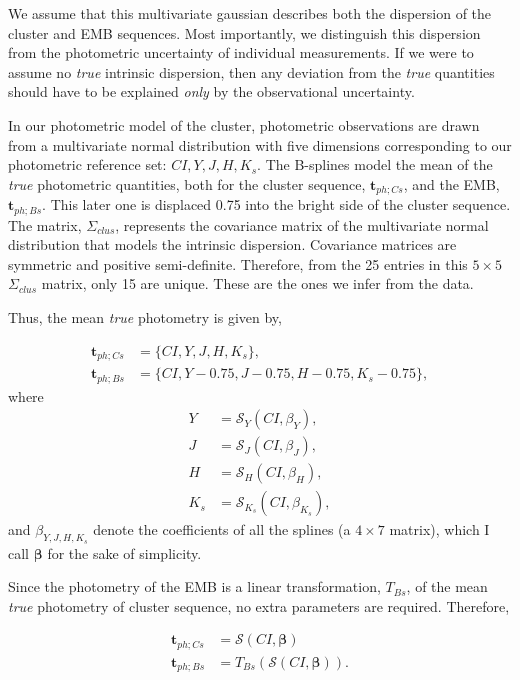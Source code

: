 We assume that this multivariate gaussian describes both the dispersion of the cluster and EMB sequences. Most importantly, we distinguish this dispersion from the photometric uncertainty of individual measurements. If we were to assume no \emph{true} intrinsic dispersion, then any deviation from the \emph{true} quantities should have to be explained \emph{only} by the observational uncertainty. 

In our photometric model of the cluster, photometric observations are drawn from a multivariate normal distribution with five dimensions corresponding to our photometric reference set: $CI,Y,J,H,K_s$. The B-splines model the mean of the \emph{true} photometric quantities, both for the cluster sequence, $\boldsymbol{t}_{ph;Cs}$, and the EMB, $\boldsymbol{t}_{ph;Bs}$. This later one is displaced 0.75 into the bright side of the cluster sequence. The matrix, $\Sigma_{clus}$, represents the covariance matrix of the multivariate normal distribution that models the intrinsic dispersion. Covariance matrices are symmetric and positive semi-definite. Therefore, from the 25 entries in this $5\times 5$ $\Sigma_{clus}$ matrix, only 15 are unique. These are the ones we infer from the data.

Thus, the mean \emph{true} photometry is given by,

\begin{align}
\boldsymbol{t}_{ph;Cs}&= \{CI,Y,J,H,K_s\},\nonumber \\
\boldsymbol{t}_{ph;Bs}&=\{CI,Y-0.75,J-0.75,H-0.75,K_s-0.75\}, \nonumber
\end{align}
where
\begin{align}
Y &=\mathcal{S}_Y(CI,\beta_Y), \nonumber \\
J &=\mathcal{S}_J(CI,\beta_J),\nonumber \\
 H &=\mathcal{S}_H(CI,\beta_H), \nonumber \\
 K_s &=\mathcal{S}_{K_s}(CI,\beta_{K_s}),  \nonumber 
\end{align}
and $\beta_{Y,J,H,K_s}$ denote the coefficients of all the splines (a $4\times7$ matrix), which  I call $\boldsymbol{\beta}$ for the sake of simplicity.

Since the photometry of the EMB is a linear transformation, $T_{Bs}$, of the mean \emph{true} photometry of cluster sequence, no extra parameters are required. Therefore, 

\begin{align}
\boldsymbol{t}_{ph;Cs} &= \boldsymbol{\mathcal{S}}(CI, \boldsymbol{\beta}) \label{eq:trueph_Cs}\\
\boldsymbol{t}_{ph;Bs} &=T_{Bs}( \boldsymbol{\mathcal{S}}(CI, \boldsymbol{\beta})).
\label{eq:trueph_Bs}
\end{align}


